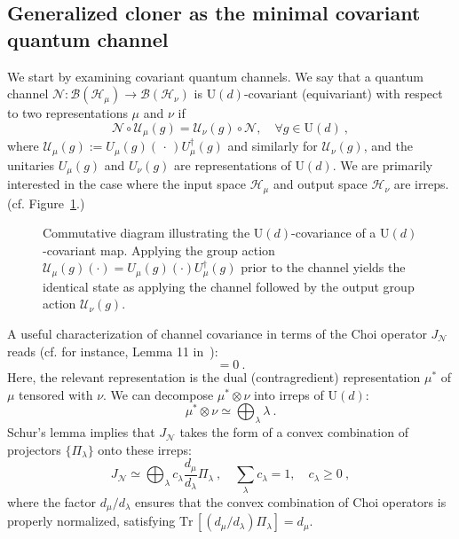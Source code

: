 \documentclass[a4paper,onecolumn,11pt]{quantumarticle}
\def\h{\mathcal{H}}
\newcommand*{\Tr}{\mathrm{Tr}}
\def\map{\mathcal}
\begin{document}
\subsection{Generalized cloner as the minimal covariant quantum channel}\label{sec:definition}
We start by examining covariant quantum channels. We say that a quantum channel $\map{N}:\mathcal B(\h_\mu)\to \mathcal B(\h_\nu)$ is $\mathrm{U}(d)$-covariant (equivariant) with respect to two representations $\mu$ and $\nu$ if 
\begin{equation}\label{eq:covariance}
    \map{N}\circ\map{U}_\mu(g) = \map{U}_\nu(g)\circ\map{N},\quad\forall g\in\mathrm{U}(d)\ ,
\end{equation}
where $\map{U}_\mu(g):= U_\mu(g)(\, \cdot\, )U_\mu^\dagger(g)$ and similarly for $\map{U}_\nu(g)$, and the unitaries $U_\mu(g)$ and $U_\nu(g)$ are representations of $\mathrm{U}(d)$. We are primarily interested in the case where the input space $\h_\mu$ and output space $\h_\nu$ are irreps. (cf. Figure~\ref{fig:covariance_diagram}.)

\begin{figure}
    \centering
    \caption{Commutative diagram illustrating the $\mathrm{U}(d)$-covariance of a $\mathrm{U}(d)$-covariant map. Applying the group action $\mathcal{U}_\mu(g)(\cdot) = U_\mu(g)(\cdot)U_\mu^\dagger(g)$ prior to the channel yields the identical state as applying the channel followed by the output group action $\mathcal{U}_\nu(g)$.}
    \label{fig:covariance_diagram}
\end{figure}

A useful characterization of channel covariance in terms of the Choi operator $J_{\mathcal{N}}$ reads (cf. for instance, Lemma 11 in~\cite{gschwendtner2021programmability}):
\begin{equation}
    [J_{\mathcal{N}},U_\mu^*\otimes U_\nu]=0\ .
\end{equation}
Here, the relevant representation is the dual (contragredient) representation $\mu^*$ of $\mu$ tensored with $\nu$. We can decompose $\mu^*\otimes\nu$ into irreps of $\mathrm{U}(d)$:
\begin{equation}\label{eq:decomp}
    \mu^*\otimes\nu \simeq \bigoplus_\lambda \lambda\ .
\end{equation}
Schur's lemma implies that $J_\mathcal{N}$ takes the form of a convex combination of projectors $\{\Pi_\lambda\}$ onto these irreps:
\begin{equation}\label{eq:covChoi}
    J_\mathcal{N}\simeq \bigoplus_\lambda c_\lambda \frac{d_\mu}{d_\lambda} \Pi_\lambda\ , \quad \sum_\lambda c_\lambda =1, \quad c_\lambda\ge 0\ ,
\end{equation}
where the factor $d_\mu/d_\lambda$ ensures that the convex combination of Choi operators is properly normalized, satisfying $\Tr\, [(d_\mu/d_\lambda)\Pi_\lambda] = d_\mu$.
\end{document}
